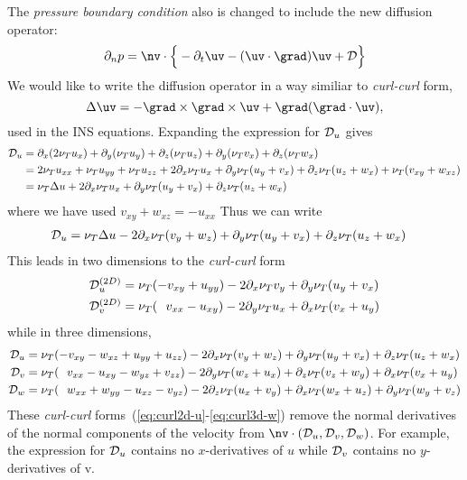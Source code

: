 The {\em pressure boundary condition} also is changed to include the new
diffusion operator:
\[
  \partial_n p = \nv\cdot\Big\{ -\partial_t \uv -(\uv\cdot\grad)\uv + {\cal D} \Big\}
\]
We would like to write the diffusion operator in a way similiar to {\em curl-curl}  form, 
\[
\Delta\uv=-\grad\times\grad\times \uv+\grad(\grad\cdot\uv), 
\]
used in the INS equations. Expanding the expression for ${\cal D}_u$ gives
\begin{align*}
   {\cal D}_u &= \partial_x( 2\nu_T u_x) + \partial_y( \nu_T u_y) + \partial_z( \nu_T u_z ) 
                    + \partial_y( \nu_T v_x ) + \partial_z( \nu_T w_x ) \\
              &= 2\nu_T u_{xx} + \nu_T u_{yy} + \nu_T u_{zz} + 2\partial_x \nu_T u_x 
                    + \partial_y\nu_T( u_y+v_x)  + \partial_z\nu_T( u_z + w_x )
                     + \nu_T( v_{xy} + w_{xz} ) \\
              &= \nu_T \Delta u + 2\partial_x \nu_T u_x + \partial_y\nu_T( u_y+v_x) + \partial_z\nu_T( u_z + w_x )
\end{align*}
where we have used $v_{xy} + w_{xz} = - u_{xx}$
Thus we can write
\begin{align*}
   {\cal D}_u &=  \nu_T \Delta u - 2\partial_x \nu_T (v_y+w_z) + \partial_y\nu_T( u_y+v_x) + \partial_z\nu_T( u_z + w_x )
\end{align*}
This leads in two dimensions to the {\em curl-curl} form
\begin{align}
   {\cal D}_u^{(2D)} &= \nu_T(-v_{xy}+u_{yy}) - 2\partial_x \nu_T v_y + \partial_y\nu_T( u_y+v_x ) \label{eq:curl2d-u} \\
   {\cal D}_v^{(2D)} &= \nu_T(~~v_{xx}-u_{xy})- 2\partial_y \nu_T u_x + \partial_x\nu_T( v_x+u_y ) \label{eq:curl2d-v}
\end{align}
while in three dimensions,
\begin{align}
   {\cal D}_u &=  \nu_T(-v_{xy}-w_{xz}+u_{yy}+u_{zz}) - 2\partial_x \nu_T (v_y+w_z)
                       + \partial_y\nu_T( u_y+v_x) + \partial_z\nu_T( u_z + w_x )  \label{eq:curl3d-u} \\
   {\cal D}_v &=  \nu_T(~~v_{xx}-u_{xy}-w_{yz}+v_{zz}) - 2\partial_y \nu_T (w_z+u_x) 
                       + \partial_z\nu_T( v_z+w_y) + \partial_x\nu_T( v_x + u_y )  \label{eq:curl3d-v} \\
   {\cal D}_w &=  \nu_T(~~w_{xx}+w_{yy}-u_{xz}-v_{yz}) - 2\partial_z \nu_T (u_x+v_y) 
                       + \partial_x\nu_T( w_x+u_z) + \partial_y\nu_T( w_y + v_z ) \label{eq:curl3d-w} 
\end{align}   
These {\em curl-curl} forms~(\ref{eq:curl2d-u}-\ref{eq:curl3d-w}) remove the normal derivatives of the
normal components of the velocity from $\nv\cdot(\Dopu,\Dopv,\Dopw)$. 
For example, the expression for ${\cal D}_u$ contains no $x$-derivatives of $u$
while ${\cal D}_v$ contains no $y$-derivatives of v.

